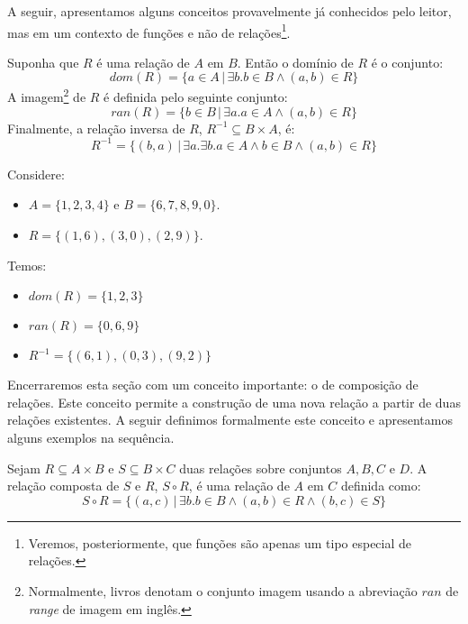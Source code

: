 A seguir, apresentamos alguns conceitos provavelmente já conhecidos
pelo leitor, mas em um contexto de funções e não de
relações\footnote{Veremos, posteriormente, que funções são apenas um
  tipo especial de relações.}.

\begin{Definition}
Suponha que $R$ é uma relação de $A$ em $B$. Então o domínio de $R$ é
o conjunto:
\[
dom(R) = \{a \in A \,|\, \exists b. b\in B \land (a,b) \in R\}
\]
A imagem\footnote{Normalmente, livros denotam o conjunto imagem usando
a abreviação $ran$ de \textit{range} de imagem em inglês.} de $R$ é definida pelo seguinte conjunto:
\[
ran(R) = \{b\in B \,|\, \exists a. a\in A \land (a,b) \in R\}
\]
Finalmente, a relação inversa de $R$, $R^{-1} \subseteq B\times A$, é:
\[
R^{-1} =\{(b,a)\,|\,\exists a. \exists b. a \in A \land b\in B \land
(a,b) \in R\}
\]
\end{Definition}

\begin{Example}
Considere:
\begin{itemize}
   \item $A = \{1,2,3,4\}$ e $B = \{6,7,8,9,0\}$.
   \item $R = \{(1,6),(3,0),(2,9)\}$.
\end{itemize}
Temos:
\begin{itemize}
   \item $dom(R) =\{1,2,3\}$
   \item $ran(R) =\{0,6,9\}$
   \item $R^{-1} = \{(6,1),(0,3),(9,2)\}$
\end{itemize}
\end{Example}

Encerraremos esta seção com um conceito importante: o de composição de
relações. Este conceito permite a construção de uma nova relação a
partir de duas relações existentes. A seguir definimos formalmente
este conceito e apresentamos alguns exemplos na sequência.

\begin{Definition}
Sejam $R \subseteq A \times B$ e $S \subseteq B \times C$ duas
relações sobre conjuntos $A,B,C$ e $D$. A relação composta
de $S$ e $R$, $S \circ R$, é uma relação de $A$ em $C$ definida
como:
\[
S \circ R =\{(a,c)\,|\,\exists b. b \in B \land (a,b) \in R \land
(b,c) \in S\}
\]
\end{Definition}

